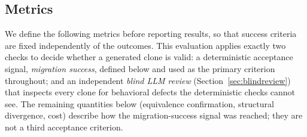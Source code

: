 

\subsection{Metrics}

We define the following metrics before reporting results, so that success criteria are fixed independently of the outcomes. This evaluation applies exactly two checks to decide whether a generated clone is valid: a deterministic acceptance signal, \emph{migration success}, defined below and used as the primary criterion throughout; and an independent \emph{blind LLM review} (Section~\ref{sec:blindreview}) that inspects every clone for behavioral defects the deterministic checks cannot see. The remaining quantities below (equivalence confirmation, structural divergence, cost) describe how the migration-success signal was reached; they are not a third acceptance criterion.

